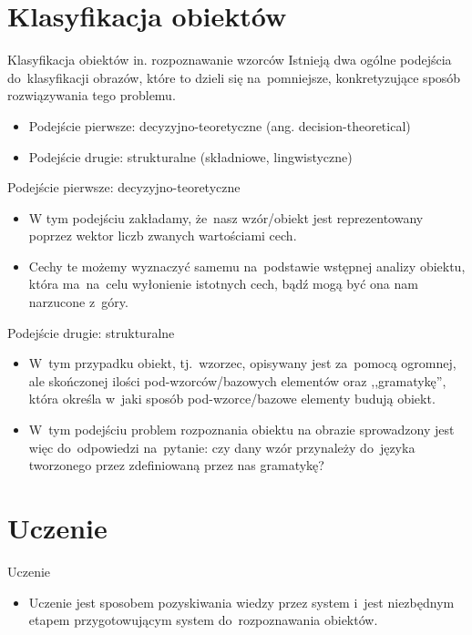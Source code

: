 \documentclass{beamer}
\begin{document}
\section{Klasyfikacja obiektów}
\begin{frame}{Klasyfikacja obiektów in. rozpoznawanie wzorców}
Istnieją dwa ogólne podejścia do~klasyfikacji obrazów, które to dzieli się na~pomniejsze, konkretyzujące sposób rozwiązywania tego problemu.
\pause
\begin{itemize}
\item Podejście pierwsze: decyzyjno-teoretyczne (ang. decision-theoretical)\
\pause
\item Podejście drugie: strukturalne (składniowe, lingwistyczne)
\end{itemize}
\end{frame}


\begin{frame}{Podejście pierwsze: decyzyjno-teoretyczne}
\begin{itemize}
\item W tym podejściu zakładamy, że~nasz wzór/obiekt jest reprezentowany poprzez wektor liczb zwanych wartościami cech. 
\pause
\item Cechy te możemy wyznaczyć samemu na~podstawie wstępnej analizy obiektu, która ma~na~celu wyłonienie istotnych cech, bądź mogą być ona nam narzucone z~góry.
\end{itemize}
\end{frame}


\begin{frame}{Podejście drugie: strukturalne}
\begin{itemize}
\item W~tym przypadku obiekt, tj.~wzorzec, opisywany jest za~pomocą ogromnej, ale skończonej ilości pod-wzorców/bazowych elementów oraz ,,gramatykę'', która określa w~jaki sposób pod-wzorce/bazowe elementy budują obiekt.
\pause
\item W~tym podejściu problem rozpoznania obiektu na obrazie sprowadzony jest więc do~odpowiedzi na~pytanie: czy dany wzór przynależy do~języka tworzonego przez zdefiniowaną przez nas gramatykę?
\end{itemize}
\end{frame}


\section{Uczenie}
\begin{frame}{Uczenie}
\begin{itemize}
\item Uczenie jest sposobem pozyskiwania wiedzy przez system i~jest niezbędnym etapem przygotowującym system do~rozpoznawania obiektów.
\end{itemize}
\end{frame}
\end{document}
